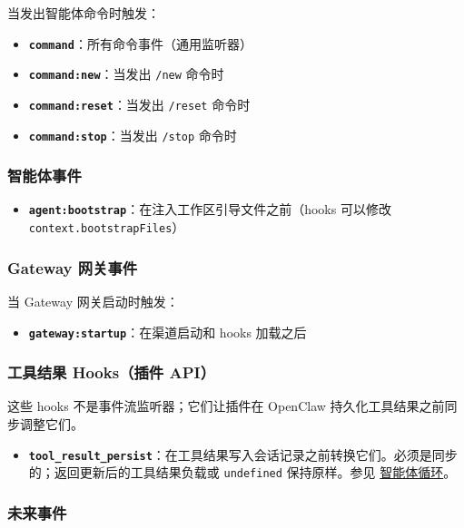 当发出智能体命令时触发：

\begin{itemize}
  \item \textbf{\texttt{command}}：所有命令事件（通用监听器）
  \item \textbf{\texttt{command:new}}：当发出 \texttt{/new} 命令时
  \item \textbf{\texttt{command:reset}}：当发出 \texttt{/reset} 命令时
  \item \textbf{\texttt{command:stop}}：当发出 \texttt{/stop} 命令时
\end{itemize}


\subsubsection{智能体事件}


\begin{itemize}
  \item \textbf{\texttt{agent:bootstrap}}：在注入工作区引导文件之前（hooks 可以修改 \texttt{context.bootstrapFiles}）
\end{itemize}


\subsubsection{Gateway 网关事件}


当 Gateway 网关启动时触发：

\begin{itemize}
  \item \textbf{\texttt{gateway:startup}}：在渠道启动和 hooks 加载之后
\end{itemize}


\subsubsection{工具结果 Hooks（插件 API）}


这些 hooks 不是事件流监听器；它们让插件在 OpenClaw 持久化工具结果之前同步调整它们。

\begin{itemize}
  \item \textbf{\texttt{tool\_result\_persist}}：在工具结果写入会话记录之前转换它们。必须是同步的；返回更新后的工具结果负载或 \texttt{undefined} 保持原样。参见 \href{/concepts/agent-loop}{智能体循环}。
\end{itemize}


\subsubsection{未来事件}


